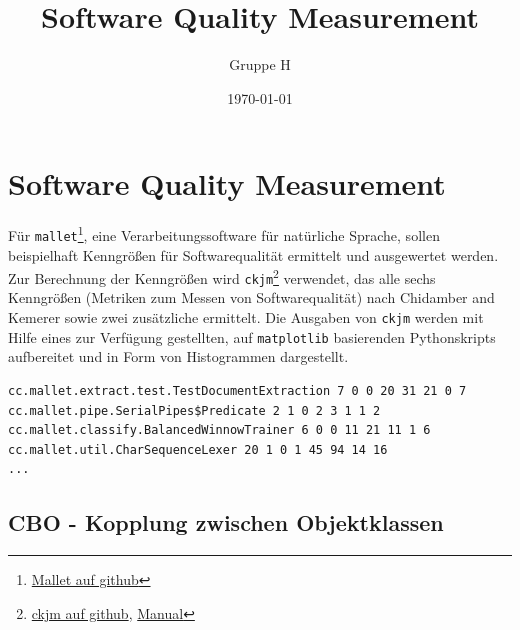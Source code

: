 \documentclass{scrreprt}
\title{Software Quality Measurement}
\author{Gruppe H}
\date{\today}
\newcommand{\lstx}[1]{\lstinline$#1$}
\begin{document}
\maketitle
\tableofcontents

\chapter{Software Quality Measurement}

Für \lstx{mallet}\footnote{\href{https://github.com/mimno/Mallet}{Mallet auf github}}, eine Verarbeitungssoftware für natürliche Sprache, sollen beispielhaft Kenngrößen für Softwarequalität ermittelt und ausgewertet werden. Zur Berechnung der Kenngrößen wird \lstx{ckjm}\footnote{\href{https://github.com/dspinellis/ckjm}{ckjm auf github},  \href{https://www.spinellis.gr/sw/ckjm/doc/indexw.html}{Manual}} verwendet, das alle sechs Kenngrößen (Metriken zum Messen von Softwarequalität) nach Chidamber and Kemerer sowie zwei zusätzliche ermittelt. Die Ausgaben von \lstx{ckjm} werden mit Hilfe eines zur Verfügung gestellten, auf \lstx{matplotlib} basierenden Pythonskripts aufbereitet und in Form von Histogrammen dargestellt.

\begin{lstlisting}[caption = Beispiele für den Output von mallet]
cc.mallet.extract.test.TestDocumentExtraction 7 0 0 20 31 21 0 7
cc.mallet.pipe.SerialPipes$Predicate 2 1 0 2 3 1 1 2
cc.mallet.classify.BalancedWinnowTrainer 6 0 0 11 21 11 1 6
cc.mallet.util.CharSequenceLexer 20 1 0 1 45 94 14 16
...
\end{lstlisting}



\section{CBO - Kopplung zwischen Objektklassen}
\end{document}
